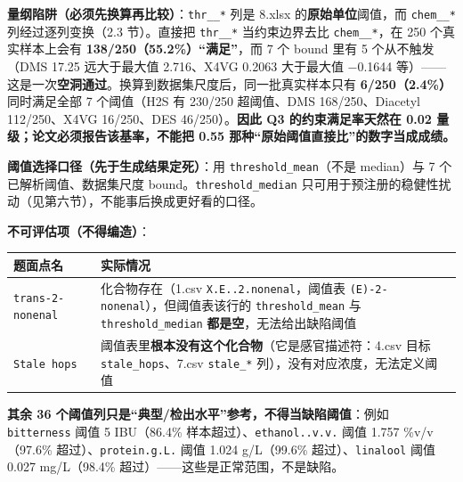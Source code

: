 \documentclass[
  11pt,
]{ctexart}
\newcounter{none} %
\begin{document}
\textbf{量纲陷阱（必须先换算再比较）}：\texttt{thr\_\_*} 列是 8.xlsx
的\textbf{原始单位}阈值，而 \texttt{chem\_\_*} 列经过逐列变换（2.3
节）。直接把 \texttt{thr\_\_*} 当约束边界去比 \texttt{chem\_\_*}，在 250
个真实样本上会有 \textbf{138/250（55.2\%）``满足''}，而 7 个 bound 里有
5 个从不触发（DMS 17.25 远大于最大值 2.716、X4VG 0.2063 大于最大值
−0.1644
等）------这是一次\textbf{空洞通过}。换算到数据集尺度后，同一批真实样本只有
\textbf{6/250（2.4\%）} 同时满足全部 7 个阈值（H2S 有 230/250
超阈值、DMS 168/250、Diacetyl 112/250、X4VG 16/250、DES
46/250）。\textbf{因此 Q3 的约束满足率天然在 0.02
量级；论文必须报告该基率，不能把 0.55
那种``原始阈值直接比''的数字当成成绩。}

\textbf{阈值选择口径（先于生成结果定死）}：用
\texttt{threshold\_\allowbreak{}mean}（不是 median）与 7 个已解析阈值、数据集尺度
bound。\texttt{threshold\_\allowbreak{}median}
只可用于预注册的稳健性扰动（见第六节），不能事后换成更好看的口径。

\textbf{不可评估项（不得编造）}：

{\def\LTcaptype{none} %
\begin{longtable}[]{@{}
  >{\raggedright\arraybackslash}p{}
  >{\raggedright\arraybackslash}p{}@{}}
\toprule\noalign{}
\begin{minipage}[b]{\linewidth}\raggedright
题面点名
\end{minipage} & \begin{minipage}[b]{\linewidth}\raggedright
实际情况
\end{minipage} \\
\midrule\noalign{}
\endhead
\bottomrule\noalign{}
\endlastfoot
\texttt{trans-2-nonenal} & 化合物存在（1.csv
\texttt{X.\allowbreak{}E.\allowbreak{}.\allowbreak{}2.\allowbreak{}nonenal}，阈值表 \texttt{(E)-2-nonenal}），但阈值表该行的
\texttt{threshold\_\allowbreak{}mean} 与 \texttt{threshold\_\allowbreak{}median}
\textbf{都是空}，无法给出缺陷阈值 \\
\texttt{Stale\ hops} &
阈值表里\textbf{根本没有这个化合物}（它是感官描述符：4.csv 目标
\texttt{stale\_hops}、7.csv \texttt{stale\_*}
列），没有对应浓度，无法定义阈值 \\
\end{longtable}
}

\textbf{其余 36 个阈值列只是``典型/检出水平''参考，不得当缺陷阈值}：例如
\texttt{bitterness} 阈值 5 IBU（86.4\%
样本超过）、\texttt{ethanol..v.v.} 阈值 1.757 \%v/v（97.6\%
超过）、\texttt{protein.g.L.} 阈值 1.024 g/L（99.6\%
超过）、\texttt{linalool} 阈值 0.027 mg/L（98.4\%
超过）------这些是正常范围，不是缺陷。
\end{document}
